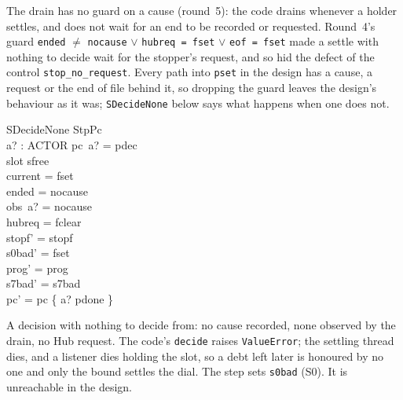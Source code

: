 \documentclass[a4paper,10pt,fleqn]{article}
\begin{document}
The drain has no guard on a cause (round~5): the code drains whenever a holder
settles, and does not wait for an end to be recorded or requested.  Round~4's
guard \texttt{ended} $\neq$ \texttt{nocause} $\lor$ \texttt{hubreq = fset} $\lor$
\texttt{eof = fset} made a settle with nothing to decide wait for the stopper's
request, and so hid the defect of the control \texttt{stop\_no\_request}.  Every
path into \texttt{pset} in the design has a cause, a request or the end of file
behind it, so dropping the guard leaves the design's behaviour as it was;
\texttt{SDecideNone} below says what happens when one does not.

\begin{schema}{SDecideNone}
  StpPc \\
  a? : ACTOR
\where
  pc~a? = pdec \\
  slot \neq sfree \\
  current = fset \\
  ended = nocause \\
  obs~a? = nocause \\
  hubreq = fclear \\
  stopf' = stopf \\
  s0bad' = fset \\
  prog' = prog \\
  s7bad' = s7bad \\
  pc' = pc \oplus \{ a? \mapsto pdone \}
\end{schema}

A decision with nothing to decide from: no cause recorded, none observed by the
drain, no Hub request.  The code's \texttt{decide} raises \texttt{ValueError}; the
settling thread dies, and a listener dies holding the slot, so a debt left later
is honoured by no one and only the bound settles the dial.  The step sets
\texttt{s0bad} (S0).  It is unreachable in the design.
\end{document}
